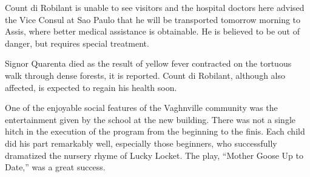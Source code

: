 \documentclass{newspaper1920}
\begin{document}
\begin{multicols}{3}
Count di Robilant is unable to see visitors and the hospital doctors
here advised the Vice Consul at Sao Paulo that he will be transported
tomorrow morning to Assis, where better medical assistance is
obtainable.  He is believed to be out of danger, but requires special
treatment.

Signor Quarenta died as the result of yellow fever contracted on the
tortuous walk through dense forests, it is reported.  Count di
Robilant, although also affected, is expected to regain his health
soon.

\fullrule


One of the enjoyable social features of the Vaghnville community was
the entertainment given by the school at the new building.  There was
not a single hitch in the execution of the program from the beginning
to the finis.  Each child did his part remarkably well, especially
those beginners, who successfully dramatized the nursery rhyme of
Lucky Locket.  The play, ``Mother Goose Up to Date,'' was a great
success.

\end{multicols}
\end{document}

